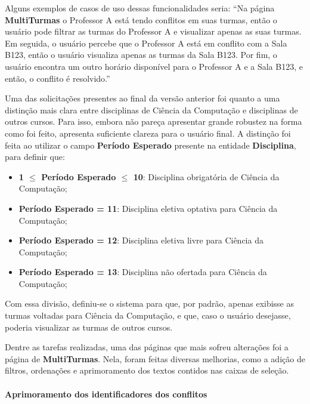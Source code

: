 Alguns exemplos de casos de uso dessas funcionalidades seria: ``Na página \textbf{MultiTurmas} o Professor A está tendo conflitos em suas turmas, então o usuário pode filtrar as turmas do Professor A e visualizar apenas as suas turmas. Em seguida, o usuário percebe que o Professor A está em conflito com a Sala B123, então o usuário visualiza apenas as turmas da Sala B123. Por fim, o usuário encontra um outro horário disponível para o Professor A e a Sala B123, e então, o conflito é resolvido.''

Uma das solicitações presentes ao final da versão anterior foi quanto a uma distinção mais clara entre disciplinas de Ciência da Computação e disciplinas de outros cursos. Para isso, embora não pareça apresentar grande robustez na forma como foi feito, apresenta suficiente clareza para o usuário final. A distinção foi feita ao utilizar o campo \textbf{Período Esperado} presente na entidade \textbf{Disciplina}, para definir que:

\begin{itemize}
  \item \textbf{1 $\leq$ Período Esperado $\leq$ 10}: Disciplina obrigatória de Ciência da Computação;
  \item \textbf{Período Esperado = 11}: Disciplina eletiva optativa para Ciência da Computação;
  \item \textbf{Período Esperado = 12}: Disciplina eletiva livre para Ciência da Computação;
  \item \textbf{Período Esperado = 13}: Disciplina não ofertada para Ciência da Computação;
\end{itemize}

Com essa divisão, definiu-se o sistema para que, por padrão, apenas exibisse as turmas voltadas para Ciência da Computação, e que, caso o usuário desejasse, poderia visualizar as turmas de outros cursos.


Dentre as tarefas realizadas, uma das páginas que mais sofreu alterações foi a página de \textbf{MultiTurmas}. Nela, foram feitas diversas melhorias, como a adição de filtros, ordenações e aprimoramento dos textos contidos nas caixas de seleção.

\paragraph*{Aprimoramento dos identificadores dos conflitos}

